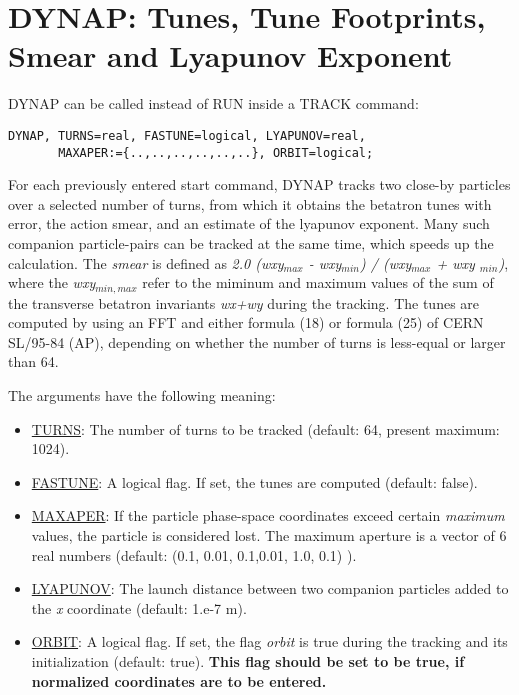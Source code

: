 
\chapter{DYNAP: Tunes, Tune Footprints, Smear and Lyapunov Exponent}

DYNAP can be called instead of RUN inside a TRACK command: 
\begin{verbatim}
DYNAP, TURNS=real, FASTUNE=logical, LYAPUNOV=real,
       MAXAPER:={..,..,..,..,..,..}, ORBIT=logical;
\end{verbatim}
 
For each previously entered start command, DYNAP tracks two close-by
particles over a selected number of turns, from which it obtains the
betatron tunes with error, the action smear, and an estimate of  the
lyapunov exponent. Many such companion particle-pairs can be tracked at
the same time, which speeds up the calculation. The \textit{ smear } is
defined as  \textit{2.0 (wxy$_{max}$ - wxy$_{min}$) / (wxy$_{max}$ + wxy
  $_{min}$)}, where the \textit{wxy$_{min,max}$} refer to the  miminum and
maximum values of the sum of the transverse betatron invariants
\textit{wx+wy} during the tracking. The tunes are computed by  using an
FFT and either formula (18) or formula (25) of CERN SL/95-84 (AP),
depending on whether the number of turns is less-equal or larger than
64. 
 
The arguments have the following meaning:
 
\begin{itemize}
   \item \href{particle}{TURNS}:
     The number of turns to be tracked (default: 64, present maximum: 1024).
     
   \item \href{particle}{FASTUNE}:
     A logical flag. If set, the tunes are computed (default: false).
 
   \item \href{particle}{MAXAPER}:
     If the particle phase-space coordinates exceed certain 
     \textit{ maximum }
     values, the particle is considered lost. The maximum aperture
     is a vector of 6 real numbers 
     (default: (0.1, 0.01, 0.1,0.01, 1.0, 0.1) ).
     
   \item \href{particle}{LYAPUNOV}:
     The launch distance 
     between two companion particles 
     added to the \textit{x} coordinate (default: 1.e-7 m).
     
   \item \href{particle}{ORBIT}:
     A logical flag. If set, the flag \textit{orbit} 
     is true during the tracking and its initialization
     (default: true).
     \textbf{ This flag should be set to be true, if 
       normalized coordinates are to be entered.}
\end{itemize}


